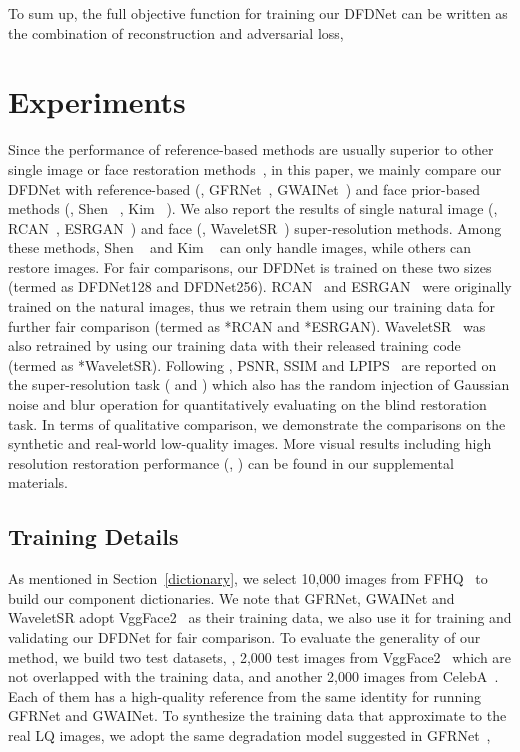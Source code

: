 \documentclass[runningheads]{llncs}
\begin{document}
To sum up, the full objective function for training our DFDNet can be written as the combination of reconstruction and adversarial loss,


\section{Experiments}
Since the performance of reference-based methods are usually superior to other single image or face restoration methods~\cite{li2018learning}, in this paper, we mainly compare our DFDNet with reference-based (\ie, GFRNet~\cite{li2018learning}, GWAINet~\cite{dogan2019exemplar}) and face prior-based methods (\ie, Shen \etal~\cite{shen2018deep}, Kim \etal~\cite{progressive_face_sr}). We also report the results of single natural image (\ie, RCAN~\cite{zhang2018rcan}, ESRGAN~\cite{wang2018esrgan}) and face (\ie, WaveletSR~\cite{huang2017wavelet}) super-resolution methods.
Among these methods, Shen \etal~\cite{shen2018deep} and Kim \etal~\cite{progressive_face_sr} can only handle  images,
while others can restore  images. For fair comparisons, our DFDNet is trained on these two sizes (termed as DFDNet128 and DFDNet256). RCAN~\cite{zhang2018rcan} and ESRGAN~\cite{wang2018esrgan} were originally trained on the natural images, thus we retrain them using our training data for further fair comparison (termed as *RCAN and *ESRGAN). WaveletSR~\cite{huang2017wavelet} was also retrained by using our training data with their released training code (termed as *WaveletSR). Following \cite{li2018learning}, PSNR, SSIM and LPIPS~\cite{zhang2018perceptual} are reported on the super-resolution task ( and ) which also has the random injection of Gaussian noise and blur operation for quantitatively evaluating on the blind restoration task. In terms of qualitative comparison, we demonstrate the comparisons on the synthetic and real-world low-quality images. More visual results including high resolution restoration performance (\ie, ) can be found in our supplemental materials. 


\subsection{Training Details}
As mentioned in Section~\ref{dictionary}, we select 10,000 images from FFHQ~\cite{karras2019style} to build our component dictionaries. We note that GFRNet, GWAINet and WaveletSR adopt VggFace2~\cite{cao2018vggface2} as their training data, we also use it for training and validating our DFDNet for fair comparison. To evaluate the generality of our method, we build two test datasets, \ie, 2,000 test images from VggFace2~\cite{cao2018vggface2} which are not overlapped with the training data, and another 2,000 images from CelebA~\cite{liu2015faceattributes}. Each of them has a high-quality reference from the same identity for running GFRNet and GWAINet. 
To synthesize the training data that approximate to the real LQ images, we adopt the same degradation model suggested in GFRNet~\cite{li2018learning},
\end{document}
